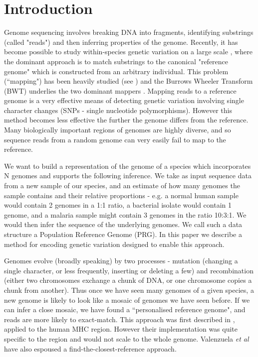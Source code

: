 \documentclass[runningheads,a4paper]{llncs}
\begin{document}
\section{Introduction}

Genome sequencing involves breaking  DNA into fragments, identifying substrings (called "reads") and then inferring properties of the genome. Recently, it has become possible to study within-species genetic variation on a large scale \cite{1000g,arabi}, where the dominant approach is to match substrings to the canonical "reference genome" which is constructed from an arbitrary individual.  This problem (``mapping") has been heavily studied  (see \cite{reinert}) and the Burrows Wheeler Transform (BWT) \cite{bwt} underlies the two dominant mappers \cite{bwa,bowtie}. Mapping reads to a reference genome is a very effective means of detecting genetic variation involving single character changes (SNPs - single nucleotide polymorphisms). However this method becomes less effective the further the genome differs from the reference.  Many biologically important regions of genomes are highly diverse, and so sequence reads from a random genome can very easily fail to map to the reference. 

We  want to build a representation of the genome of a species which incorporates N genomes and supports the following inference. We take as input sequence data from a new sample of our species, and  an estimate of how many genomes the sample contains and their relative proportions - e.g. a normal human sample would contain 2 genomes in a 1:1 ratio, a bacterial isolate would contain 1 genome, and a malaria sample might contain 3 genomes in the ratio 10:3:1. We would then infer the sequence of the underlying genomes. We call such a data structure a Population Reference Genome (PRG). In this paper we describe a method for encoding genetic variation designed to enable this approach. 

Genomes evolve (broadly speaking) by two processes - mutation (changing a single character, or less frequently, inserting or deleting a few) and recombination (either two chromosomes exchange a chunk of DNA, or one chromosome copies a chunk from another). Thus once we have seen many genomes of a given species, a new genome is likely to look like a mosaic of genomes we have seen before.  If we can infer a close mosaic, we have found a ``personalised reference genome", and reads are more likely to exact-match. This approach was first described in \cite{dilthey}, applied to the human MHC region. However their implementation was quite specific to the region and would not scale to the whole genome. Valenzuela \textit{et al} \cite{valen} have  also espoused a find-the-closest-reference approach.
\end{document}
